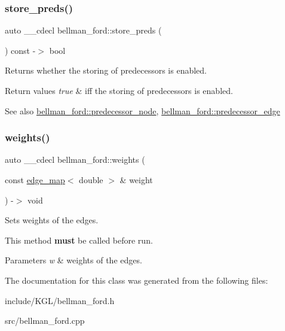 \subsubsection{\texorpdfstring{store\+\_\+preds()}{store\_preds()}\hspace{0.1cm}{\footnotesize\ttfamily [2/2]}}
{\footnotesize\ttfamily auto \+\_\+\+\_\+cdecl bellman\+\_\+ford\+::store\+\_\+preds (\begin{DoxyParamCaption}{ }\end{DoxyParamCaption}) const -\/$>$ bool \hspace{0.3cm}{\ttfamily [inline]}}



Returns whether the storing of predecessors is enabled. 


\begin{DoxyRetVals}{Return values}
{\em true} & iff the storing of predecessors is enabled. ~\newline
 \\
\hline
\end{DoxyRetVals}
\begin{DoxySeeAlso}{See also}
\mbox{\hyperlink{classbellman__ford_a403e286ec8cbe3c30a7a729c5041155e}{bellman\+\_\+ford\+::predecessor\+\_\+node}}, \mbox{\hyperlink{classbellman__ford_a367c6fa92aaf08ddbc4c9545eabf6518}{bellman\+\_\+ford\+::predecessor\+\_\+edge}} 
\end{DoxySeeAlso}
\mbox{\label{classbellman__ford_aecf5bf7eb9c1ccd4be263ea1f7fe4690}} 
\subsubsection{\texorpdfstring{weights()}{weights()}}
{\footnotesize\ttfamily auto \+\_\+\+\_\+cdecl bellman\+\_\+ford\+::weights (\begin{DoxyParamCaption}\item[{const \mbox{\hyperlink{classedge__map}{edge\+\_\+map}}$<$ double $>$ \&}]{weight }\end{DoxyParamCaption}) -\/$>$ void \hspace{0.3cm}{\ttfamily [inline]}}



Sets weights of the edges. 

This method {\bfseries must} be called before run.


\begin{DoxyParams}{Parameters}
{\em w} & weights of the edges. \\
\hline
\end{DoxyParams}


The documentation for this class was generated from the following files\+:\begin{DoxyCompactItemize}
\item 
include/\+K\+G\+L/bellman\+\_\+ford.\+h\item 
src/bellman\+\_\+ford.\+cpp\end{DoxyCompactItemize}
